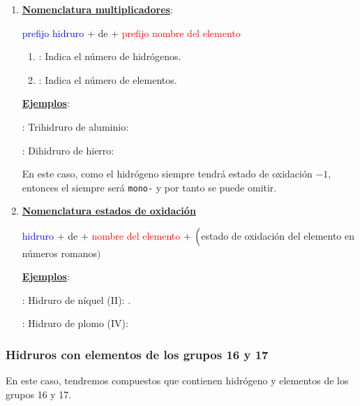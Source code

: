 \documentclass[11pt, a4paper]{article}
\begin{document}
\begin{enumerate}[label=\itembolascolor{\arabic*}{blue}]
    \item \textbf{\uline{Nomenclatura multiplicadores}}:
          \begin{center}
              \textcolor{blue}{prefijo} \textcolor{blue}{hidruro}  + de + \textcolor{red}{prefijo nombre del elemento }
          \end{center}

          \begin{enumerate}[label=\textcolor{red}{$\bullet$}]
              \item {}: Indica el número de hidrógenos.
              \item {}: Indica el número de elementos.
          \end{enumerate}

          \textbf{\uline{Ejemplos}}:

           : Trihidruro de aluminio: 

           : Dihidruro de hierro: 

En este caso, como el hidrógeno siempre tendrá estado de oxidación \(-1\), entonces el  siempre será \texttt{mono-} y por tanto se puede omitir.

    \item \textbf{\uline{Nomenclatura estados de oxidación}}
          \begin{center}
              \textcolor{blue}{hidruro} + de + \textcolor{red}{nombre del elemento} + $\Bigl($\textcolor{green!50!black}{estado de oxidación del elemento en números romanos}$\Bigr)$
          \end{center}

          \textbf{\uline{Ejemplos}}:

           : Hidruro de níquel (II): .

           : Hidruro de plomo (IV): 
\end{enumerate}


\subsubsection{Hidruros con elementos de los grupos 16 y 17}\label{sec:hidruros_16_17}

En este caso, tendremos compuestos que contienen hidrógeno y elementos de los grupos 16 y 17.
\end{document}
